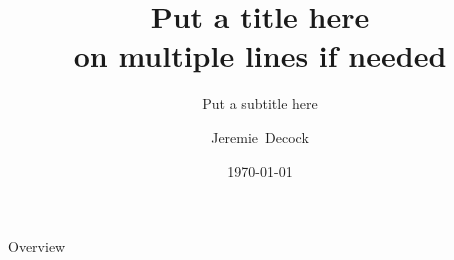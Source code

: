 






\title{Put a title here\\on multiple lines if needed}
\subtitle{Put a subtitle here}

\author[Decock]{Jeremie~Decock}


\date{\today}

\subject{The subject of the presentation}







\begin{frame}
    \titlepage
\end{frame}
\note{
}

\logo{\insertframenumber}




\begin{frame}{Overview}
    \tableofcontents[hideallsubsections]
\end{frame}
\note{
}












